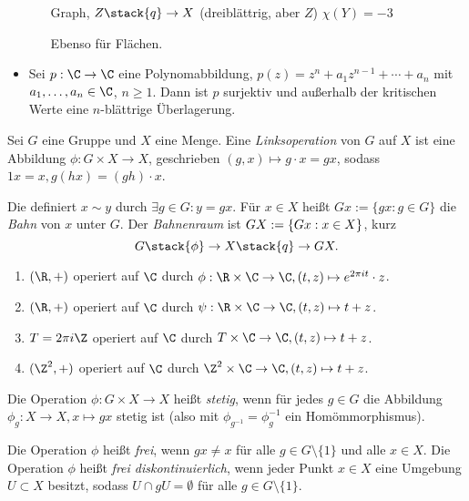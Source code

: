 \begin{ex}
\begin{itemize}
\begin{itemize}
					Graph, $Z \stack{q}\to X$ (dreiblättrig, aber $Z$)
					$\chi(Y) = -3$

					Ebenso für Flächen.
			\end{itemize}
		\item
			Sei $p: \C \to \C$ eine Polynomabbildung, $p(z) = z^n + a_1 z^{n-1} + \dotsb + a_n$ mit $a_1, \dotsc, a_n \in \C$, $n \ge 1$.
			Dann ist $p$ surjektiv und außerhalb der kritischen Werte eine $n$-blättrige Überlagerung.
	\end{itemize}
\end{ex}

\begin{df}
	Sei $G$ eine Gruppe und $X$ eine Menge.
	Eine \emph{Linksoperation} von $G$ auf $X$ ist eine Abbildung $\phi: G \times X \to X$, geschrieben $(g, x) \mapsto g \cdot x = gx$, sodass $1 x = x, g(hx) = (gh) \cdot x$.

	Die definiert $x \sim y$ durch $\exists g \in G: y = gx$.
	Für $x \in X$ heißt $Gx := \{gx : g \in G\}$ die \emph{Bahn} von $x$ unter $G$.
	Der \emph{Bahnenraum} ist $G \\ X := \{ Gx : x \in X \}$, kurz
	\[
		G \stack{\phi}\to X \stack{q}\surto G \\ X.
	\]
\end{df}

\begin{ex}
	\begin{enumerate}[1)]
		\item
			$(\R, +)$ operiert auf $\C$ durch $\phi: \R \times \C \to \C, (t, z) \mapsto e^{2\pi i t} \cdot z$.
		\item
			$(\R, +)$ operiert auf $\C$ durch $\psi: \R \times \C \to \C, (t, z) \mapsto t + z$.
		\item
			$T = 2\pi i \Z$ operiert auf $\C$ durch $T \times \C \to \C, (t, z) \mapsto t + z$.
		\item
			$(\Z^2, +)$ operiert auf $\C$ durch $\Z^2 \times \C \to \C, (t, z) \mapsto t + z$.
	\end{enumerate}
\end{ex}

\begin{df}
	Die Operation $\phi: G \times X \to X$ heißt \emph{stetig}, wenn für jedes $g \in G$ die Abbildung $\phi_g: X \to X, x \mapsto gx$ stetig ist (also mit $\phi_{g^{-1}} = \phi_{g}^{-1}$ ein Homömmorphismus).

	Die Operation $\phi$ heißt \emph{frei}, wenn $gx \neq x$ für alle $g \in G \setminus \{1\}$ und alle $x \in X$.
	Die Operation $\phi$ heißt \emph{frei diskontinuierlich}, wenn jeder Punkt $x \in X$ eine Umgebung $U \subset X$ besitzt, sodass $U \cap g U = \emptyset$ für alle $g \in G \setminus \{1\}$.
\end{df}


